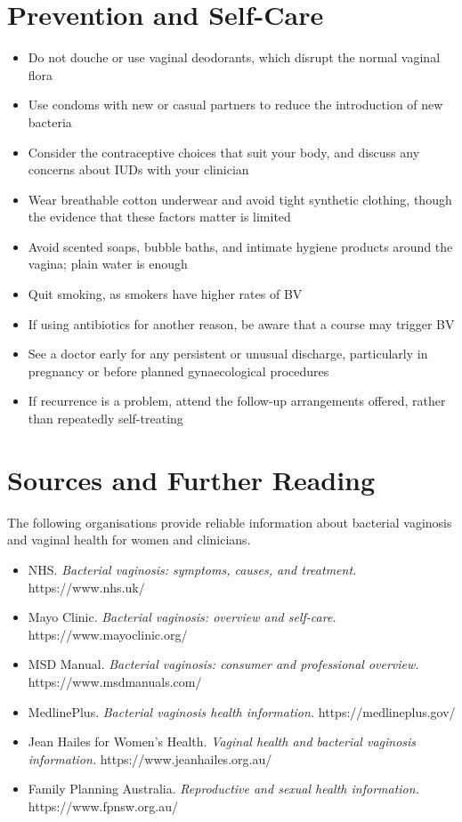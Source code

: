 \section*{Prevention and Self-Care}
\begin{itemize}
    \item Do not douche or use vaginal deodorants, which disrupt the normal vaginal flora
    \item Use condoms with new or casual partners to reduce the introduction of new bacteria
    \item Consider the contraceptive choices that suit your body, and discuss any concerns about IUDs with your clinician
    \item Wear breathable cotton underwear and avoid tight synthetic clothing, though the evidence that these factors matter is limited
    \item Avoid scented soaps, bubble baths, and intimate hygiene products around the vagina; plain water is enough
    \item Quit smoking, as smokers have higher rates of BV
    \item If using antibiotics for another reason, be aware that a course may trigger BV
    \item See a doctor early for any persistent or unusual discharge, particularly in pregnancy or before planned gynaecological procedures
    \item If recurrence is a problem, attend the follow-up arrangements offered, rather than repeatedly self-treating
\end{itemize}

\section*{Sources and Further Reading}
The following organisations provide reliable information about bacterial vaginosis and vaginal health for women and clinicians.

\begin{itemize}
    \item NHS. \textit{Bacterial vaginosis: symptoms, causes, and treatment.} https://www.nhs.uk/
    \item Mayo Clinic. \textit{Bacterial vaginosis: overview and self-care.} https://www.mayoclinic.org/
    \item MSD Manual. \textit{Bacterial vaginosis: consumer and professional overview.} https://www.msdmanuals.com/
    \item MedlinePlus. \textit{Bacterial vaginosis health information.} https://medlineplus.gov/
    \item Jean Hailes for Women's Health. \textit{Vaginal health and bacterial vaginosis information.} https://www.jeanhailes.org.au/
    \item Family Planning Australia. \textit{Reproductive and sexual health information.} https://www.fpnsw.org.au/
\end{itemize}
